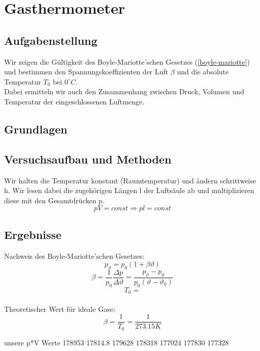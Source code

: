 \documentclass{article}
\begin{document}
\section{Gasthermometer}
\subsection{Aufgabenstellung}
Wir zeigen die Gültigkeit des Boyle-Mariotte'schen Gesetzes (\ref{boyle-mariotte}) und bestimmen den Spannungskoeffizienten der Luft $\beta$ und die absolute Temperatur $T_0$ bei $0^\circ C$.\\
Dabei ermitteln wir auch den Zusammenhang zwischen Druck, Volumen und Temperatur der eingeschlossenen Luftmenge.
\subsection{Grundlagen}
\subsection{Versuchsaufbau und Methoden}
Wir halten die Temperatur konstant (Raumtemperatur) und ändern schrittweise h. Wir lesen dabei die zugehörigen Längen l der Luftsäule ab und multiplizieren diese mit den Gesamtdrücken p. 
$$pV=const \Rightarrow pl=const$$
\subsection{Ergebnisse}
Nachweis des Boyle-Mariotte'schen Gesetzes:\\

$$p_{\vartheta}=p_0 (1+\beta \vartheta)$$
$$\beta=\frac{1}{p_0}\frac{\Delta p}{\Delta \vartheta}=\frac{p_{\vartheta}-p_0}{p_0(\vartheta - \vartheta_0)}$$
$$T_0=$$
\\
Theoretischer Wert für ideale Gase:\\
$$\beta=\frac{1}{T_0}=\frac{1}{273.15K}$$

unsere p*V Werte
178953
17814.8
179628
178318
177024
177830
177328
\end{document}
